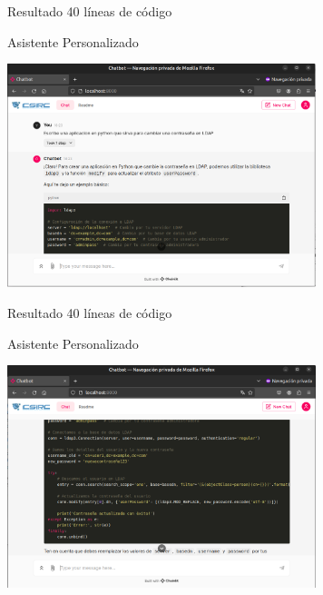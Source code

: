 \documentclass[table, unknownkeysallowed, 10pt]{beamer}
\begin{document}
\begin{frame}{Resultado 40 líneas de código}
    \begin{block}{Asistente Personalizado}
    \begin{center}
        \includegraphics[width=9cm]{imagenes/chainlit1.png}
    \end{center}
\end{block}
\end{frame}

\begin{frame}{Resultado 40 líneas de código}
    \begin{block}{Asistente Personalizado}
    \begin{center}
        \includegraphics[width=9cm]{imagenes/chainlit2.png}
    \end{center}
\end{block}
\end{frame}
\end{document}
